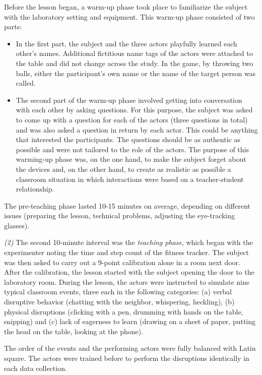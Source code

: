 \documentclass[
  man,floatsintext]{apa6}
\providecommand{\tightlist}{%
  \setlength{\itemsep}{0pt}\setlength{\parskip}{0pt}}
\begin{document}
Before the lesson began, a warm-up phase took place to familiarize the subject with the laboratory setting and equipment. This warm-up phase consisted of two parts:

\begin{itemize}
\tightlist
\item
  In the first part, the subject and the three actors playfully learned each other's names. Additional fictitious name tags of the actors were attached to the table and did not change across the study. In the game, by throwing two balls, either the participant's own name or the name of the target person was called.
\item
  The second part of the warm-up phase involved getting into conversation with each other by asking questions. For this purpose, the subject was asked to come up with a question for each of the actors (three questions in total) and was also asked a question in return by each actor. This could be anything that interested the participants. The questions should be as authentic as possible and were not tailored to the role of the actors.
  The purpose of this warming-up phase was, on the one hand, to make the subject forget about the devices and, on the other hand, to create as realistic as possible a classroom situation in which interactions were based on a teacher-student relationship.
\end{itemize}

The pre-teaching phase lasted 10-15 minutes on average, depending on different issues (preparing the lesson, technical problems, adjusting the eye-tracking glasses).

\emph{(2)} The second 10-minute interval was the \emph{teaching phase}, which began with the experimenter noting the time and step count of the fitness tracker. The subject was then asked to carry out a 9-point calibration alone in a room next door. After the calibration, the lesson started with the subject opening the door to the laboratory room.
During the lesson, the actors were instructed to simulate nine typical classroom events, three each in the following categories: (a) verbal disruptive behavior (chatting with the neighbor, whispering, heckling), (b) physical disruptions (clicking with a pen, drumming with hands on the table, snipping) and (c) lack of eagerness to learn (drawing on a sheet of paper, putting the head on the table, looking at the phone).

The order of the events and the performing actors were fully balanced with Latin square. The actors were trained before to perform the disruptions identically in each data collection.
\end{document}
